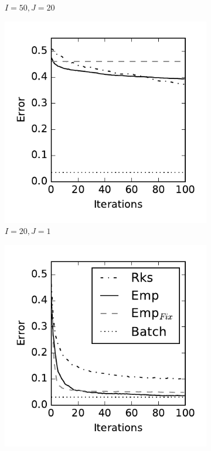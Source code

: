 \documentclass{article} %
\begin{document}
\begin{figure}[!ht]
\begin{subfigure}[b]{0.235\textwidth}
        \caption{$I=50, J=20$}
        \label{fig:expand_20_pred_50}
    \end{subfigure}
        \begin{subfigure}[b]{0.235\textwidth}
        \includegraphics[width=\textwidth]{imgs/rks_emp_comparison-pred-20-expand-1}
        \caption{$I=20, J=1$}
        \label{fig:pred_20_expand_1}
    \end{subfigure}
    \hfill
    \begin{subfigure}[b]{0.235\textwidth}
        \includegraphics[width=\textwidth]{imgs/rks_emp_comparison-pred-20-expand-50}

\end{subfigure}
\end{figure}
\end{document}
